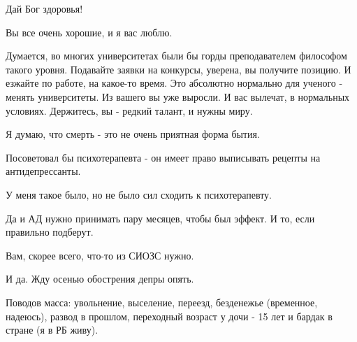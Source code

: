 \begin{itemize}
Дай Бог здоровья!

 
Вы все очень хорошие, и я вас люблю.

 

Думается, во многих университетах были бы горды преподавателем философом такого
уровня. Подавайте заявки на конкурсы, уверена, вы получите позицию. И езжайте
по работе, на какое-то время. Это абсолютно нормально для ученого - менять
университеты. Из вашего вы уже выросли. И вас вылечат, в нормальных условиях.
Держитесь, вы - редкий талант, и нужны миру.

 

Я думаю, что смерть - это не очень приятная форма бытия.

Посоветовал бы психотерапевта - он имеет право выписывать рецепты на
антидепрессанты.

У меня такое было, но не было сил сходить к психотерапевту.

Да и АД нужно принимать пару месяцев, чтобы был эффект. И то, если правильно
подберут.

Вам, скорее всего, что-то из СИОЗС нужно.

\begin{itemize}
 
И да. Жду осенью обострения депры опять.

Поводов масса: увольнение, выселение, переезд, безденежье (временное, надеюсь),
развод в прошлом, переходный возраст у дочи - 15 лет и бардак в стране (я в РБ
живу).


\end{itemize}
\end{itemize}
